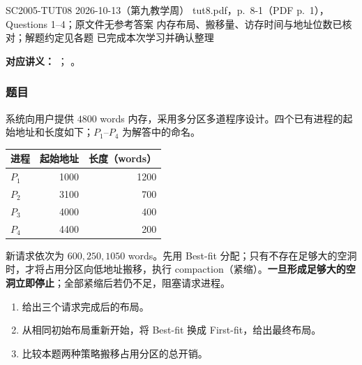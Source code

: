 
\label{tutorial:SC2005-TUT08}

\tutorialmeta
  {SC2005-TUT08}
  {2026-10-13（第九教学周）}
  {tut8.pdf，p.~8-1（PDF p.~1），Questions 1--4；原文件无参考答案}
  {内存布局、搬移量、访存时间与地址位数已核对；解题约定见各题}
  {已完成本次学习并确认整理}

\nopagebreak[4]

\textbf{对应讲义：}
；
。

\subsubsection*{题目}

系统向用户提供 $4800$ words 内存，采用多分区多道程序设计。四个已有进程的起始地址和长度如下；$P_1$--$P_4$ 为解答中的命名。
\begin{center}
\begin{tabular}{@{}lrr@{}}
\toprule
进程 & 起始地址 & 长度（words） \\
\midrule
$P_1$ & 1000 & 1200 \\
$P_2$ & 3100 & 700 \\
$P_3$ & 4000 & 400 \\
$P_4$ & 4400 & 200 \\
\bottomrule
\end{tabular}
\end{center}
新请求依次为 $600,250,1050$ words。先用 Best-fit 分配；只有不存在足够大的空洞时，才将占用分区向低地址搬移，执行 compaction（紧缩）。\textbf{一旦形成足够大的空洞立即停止}；全部紧缩后若仍不足，阻塞请求进程。
\begin{enumerate}[label=(\alph*)]
  \item 给出三个请求完成后的布局。
  \item 从相同初始布局重新开始，将 Best-fit 换成 First-fit，给出最终布局。
  \item 比较本题两种策略搬移占用分区的总开销。
\end{enumerate}

